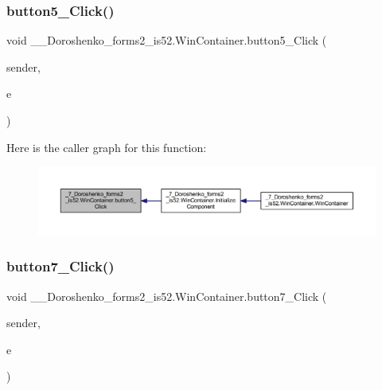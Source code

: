\subsubsection{\texorpdfstring{button5\+\_\+\+Click()}{button5\_Click()}}
{\footnotesize\ttfamily void \+\_\+\_\+\+Doroshenko\+\_\+forms2\+\_\+is52.\+Win\+Container.\+button5\+\_\+\+Click (\begin{DoxyParamCaption}\item[{object}]{sender,  }\item[{Event\+Args}]{e }\end{DoxyParamCaption})\hspace{0.3cm}{\ttfamily [private]}}

Here is the caller graph for this function\+:
\nopagebreak
\begin{figure}[H]
\begin{center}
\leavevmode
\includegraphics[width=350pt]{class__7___doroshenko__forms2__is52_1_1_win_container_a25a617a2c938199596c5dc653fba1770_icgraph}
\end{center}
\end{figure}
\hypertarget{class__7___doroshenko__forms2__is52_1_1_win_container_ab6d9121748802b45866dd3365e50015c}{}\label{class__7___doroshenko__forms2__is52_1_1_win_container_ab6d9121748802b45866dd3365e50015c} 
\subsubsection{\texorpdfstring{button7\+\_\+\+Click()}{button7\_Click()}}
{\footnotesize\ttfamily void \+\_\+\_\+\+Doroshenko\+\_\+forms2\+\_\+is52.\+Win\+Container.\+button7\+\_\+\+Click (\begin{DoxyParamCaption}\item[{object}]{sender,  }\item[{Event\+Args}]{e }\end{DoxyParamCaption})\hspace{0.3cm}{\ttfamily [private]}}

